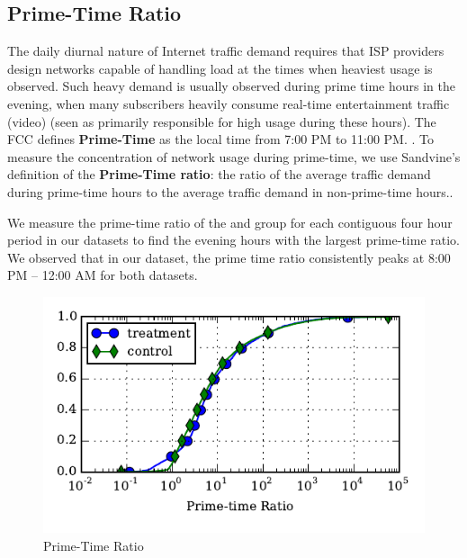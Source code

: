\subsection{Prime-Time Ratio} \label{subsec:primetime}

The daily diurnal nature of Internet traffic demand requires that ISP providers 
design networks capable of handling load at the times when heaviest usage is 
observed. Such heavy demand is usually observed during prime time hours in the 
evening, when many subscribers heavily consume real-time entertainment traffic
(video) (seen as primarily responsible for high usage during these hours). The FCC defines 
\textbf{Prime-Time} as the local time from 7:00 PM to 11:00 PM.
\cite{fcc2014measuring-broadband}. To measure the concentration of network usage
during prime-time, we use Sandvine's definition of the \textbf{Prime-Time 
ratio}: the ratio of the average traffic demand during prime-time hours to the average 
traffic demand in non-prime-time hours.\cite{sandvine20141h, sandvine20142h}.

We measure the prime-time ratio of the \control{} and \treatment{} group
for each contiguous four hour period in our datasets to find the evening hours with
the largest prime-time ratio. We observed that in our dataset,
the prime time ratio consistently peaks at 8:00 PM -- 12:00 AM for both
datasets.

\begin{figure}[t]
\begin{minipage}{1\linewidth}
\centering
\includegraphics[width=1\linewidth]{figures/prime-time-ratio-per-device-cdf-MEAN.pdf}
\caption{Prime-Time Ratio\label{fig:cdf-prime-time-ratio}}
\end{minipage}
\end{figure}


